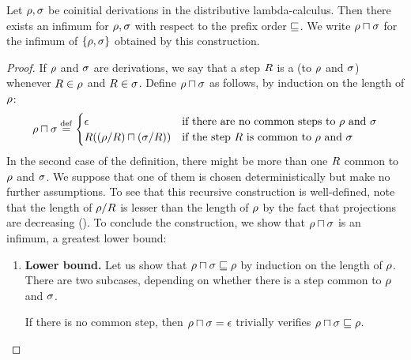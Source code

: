 \begin{proposition}
Let $\rho,\sigma$ be coinitial derivations in the distributive lambda-calculus.
Then there exists an infimum for $\rho,\sigma$ with respect to the prefix order $\sqsubseteq$.
We write $\rho \sqcap \sigma$ for the infimum of $\{\rho,\sigma\}$ obtained by this
construction.
\end{proposition}
\begin{proof}
If $\rho$ and $\sigma$ are derivations, we say that a step $R$
is a  (to $\rho$ and $\sigma$) whenever $R \in \rho$ and $R \in \sigma$.
Define $\rho \sqcap \sigma$ as follows,
by induction on the length of $\rho$:
\[
  \rho \sqcap \sigma \overset{\mathrm{def}}{=}
    \begin{cases}
    \epsilon & \text{if there are no common steps to $\rho$ and $\sigma$} \\
    R((\rho/R) \sqcap (\sigma/R)) & \text{if the step $R$ is common to $\rho$ and $\sigma$ } \\
    \end{cases}
\]
In the second case of the definition, there might be more than one $R$
common to $\rho$ and $\sigma$.
We suppose that one of them is chosen deterministically but make no further assumptions.
To see that this recursive construction is well-defined,
note that the length of $\rho/R$ is lesser than the length of $\rho$
by the fact that projections are decreasing ().
To conclude the construction, we show that $\rho \sqcap \sigma$ is an infimum, \ie a greatest lower bound:
\begin{enumerate}
\item {\bf Lower bound.}
  Let us show that $\rho \sqcap \sigma \sqsubseteq \rho$
  by induction on the length of $\rho$.
  There are two subcases, depending on whether
  there is a step common to $\rho$ and $\sigma$.

  If there is no common step,
  then $\rho \sqcap \sigma = \epsilon$
  trivially verifies $\rho \sqcap \sigma \sqsubseteq \rho$.


\end{enumerate}
\end{proof}
